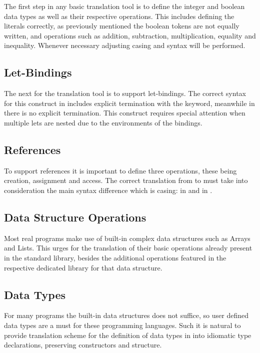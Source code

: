 The first step in any basic translation tool is to define the integer and boolean data types as well as their respective operations.
This includes defining the literals correctly, as previously mentioned the boolean tokens are not equally written, and operations
such as addition, subtraction, multiplication, equality and inequality. Whenever necessary adjusting casing and syntax will be performed.

\subsection{Let-Bindings}


The next for the translation tool is to support let-bindings. The correct syntax for this construct in \cml includes explicit 
termination with the  keyword, meanwhile in \ocaml there is no explicit termination. This construct requires 
special attention when multiple lets are nested due to the environments of the bindings.

\subsection{References}

To support references it is important to define three operations, these being creation, assignment and access. The correct translation
from \cml to \ocaml must take into consideration the main syntax difference which is casing:  in \ocaml
and  in \cml.

\subsection{Data Structure Operations}

Most real programs make use of built-in complex data structures such as Arrays and Lists. This urges for the translation of their 
basic operations already present in the standard library, besides the additional operations featured in the respective dedicated 
library for that data structure.

\subsection{Data Types}

For many programs the built-in data structures does not suffice, so user defined data types are a must for these programming languages.
Such it is natural to provide translation scheme for the definition of data types in \cml into idiomatic \ocaml type declarations, 
preserving constructors and structure.

